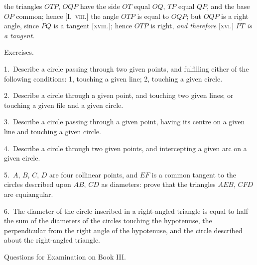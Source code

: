 \documentclass[oneside]{book}
\newcommand\exhead[1]{
\Needspace*{5\baselineskip}\begin{center}
\textsf{#1}
\end{center}
}
\begin{document}
the triangles $OTP$, $OQP$ have the side $OT$ equal $OQ$,
$TP$ equal $QP$, and the base $OP$ common; hence [I.~\textsc{viii.}]
the angle $OTP$ is equal to $OQP$; but $OQP$ is a right
angle, since $PQ$ is a tangent [\textsc{xviii.}]; hence $OTP$ is
right, \emph{and therefore} [\textsc{xvi.}] \emph{$PT$ is a tangent.}

\exhead{Exercises.}

\begin{footnotesize}
1.~Describe a circle passing through two given points, and
fulfilling either of the following conditions: 1, touching a given
line; 2, touching a given circle.

2.~Describe a circle through a given point, and touching two
given lines; or touching\label{touchlng} a given file and a given circle.

3.~Describe a circle passing through a given point, having its
centre on a given line and touching a given circle.

4.~Describe a circle through two given points, and intercepting
a given arc on a given circle.

5.~$A$, $B$, $C$, $D$ are four collinear points, and $EF$ is a common
tangent to the circles described upon $AB$, $CD$ as diameters:
prove that the triangles $AEB$, $CFD$ are equiangular.

6.~The diameter of the circle inscribed in a right-angled triangle
is equal to half the sum of the diameters of the circles
touching the hypotenuse, the perpendicular from the right angle
of the hypotenuse, and the circle described about the right-angled
triangle.
\par\end{footnotesize}


\exhead{Questions for Examination on Book III\@.}
\end{document}
